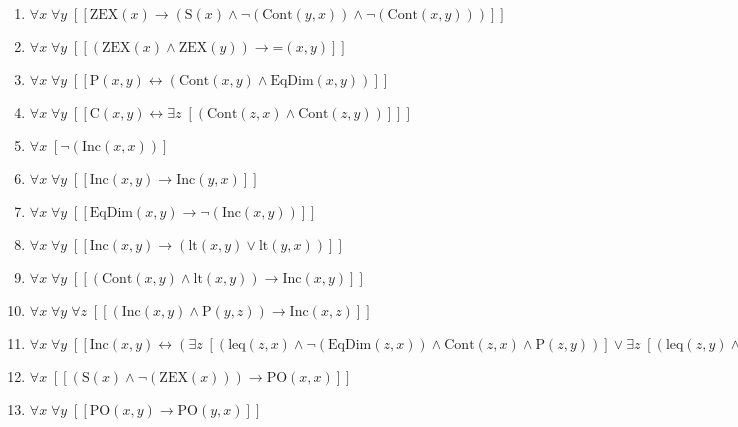 \documentclass{article}
\begin{document}
\begin{enumerate}
\item $\forall x\; \forall y\;  \left[ \left[ \textrm{ZEX}(x) \rightarrow \left(\textrm{S}(x) \land \neg \left(\textrm{Cont}(y,x)\right) \land \neg \left(\textrm{Cont}(x,y)\right)\right) \right] \right]$
\item $\forall x\; \forall y\;  \left[ \left[ \left(\textrm{ZEX}(x) \land \textrm{ZEX}(y)\right) \rightarrow \textrm{=}(x,y) \right] \right]$
\item $\forall x\; \forall y\;  \left[ \left[ \textrm{P}(x,y) \leftrightarrow \left(\textrm{Cont}(x,y) \land \textrm{EqDim}(x,y)\right) \right] \right]$
\item $\forall x\; \forall y\;  \left[ \left[ \textrm{C}(x,y) \leftrightarrow \exists z\;  \left[ \left(\textrm{Cont}(z,x) \land \textrm{Cont}(z,y)\right) \right] \right] \right]$
\item $\forall x\;  \left[ \neg \left(\textrm{Inc}(x,x)\right) \right]$
\item $\forall x\; \forall y\;  \left[ \left[ \textrm{Inc}(x,y) \rightarrow \textrm{Inc}(y,x) \right] \right]$
\item $\forall x\; \forall y\;  \left[ \left[ \textrm{EqDim}(x,y) \rightarrow \neg \left(\textrm{Inc}(x,y)\right) \right] \right]$
\item $\forall x\; \forall y\;  \left[ \left[ \textrm{Inc}(x,y) \rightarrow \left(\textrm{lt}(x,y) \lor \textrm{lt}(y,x)\right) \right] \right]$
\item $\forall x\; \forall y\;  \left[ \left[ \left(\textrm{Cont}(x,y) \land \textrm{lt}(x,y)\right) \rightarrow \textrm{Inc}(x,y) \right] \right]$
\item $\forall x\; \forall y\; \forall z\;  \left[ \left[ \left(\textrm{Inc}(x,y) \land \textrm{P}(y,z)\right) \rightarrow \textrm{Inc}(x,z) \right] \right]$
\item $\forall x\; \forall y\;  \left[ \left[ \textrm{Inc}(x,y) \leftrightarrow \left(\exists z\;  \left[ \left(\textrm{leq}(z,x) \land \neg \left(\textrm{EqDim}(z,x)\right) \land \textrm{Cont}(z,x) \land \textrm{P}(z,y)\right) \right] \lor \exists z\;  \left[ \left(\textrm{leq}(z,y) \land \neg \left(\textrm{EqDim}(z,y)\right) \land \textrm{Cont}(z,y) \land \textrm{P}(z,x)\right) \right]\right) \right] \right]$
\item $\forall x\;  \left[ \left[ \left(\textrm{S}(x) \land \neg \left(\textrm{ZEX}(x)\right)\right) \rightarrow \textrm{PO}(x,x) \right] \right]$
\item $\forall x\; \forall y\;  \left[ \left[ \textrm{PO}(x,y) \rightarrow \textrm{PO}(y,x) \right] \right]$

\end{enumerate}
\end{document}
